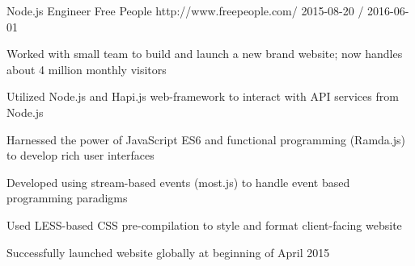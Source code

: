 \documentclass[11pt, a4paper]{awesome-cv}
\begin{document}
\begin{cventries}
  \cventry
    {Node.js Engineer}
    {Free People}
    {http://www.freepeople.com/}
    {2015-08-20 / 2016-06-01}
    {
          \begin{cvitems}
                \item{Worked with small team to build and launch a new brand website; now handles about 4 million monthly visitors}
                    \begin{cvitemssub}
                        \item{Utilized Node.js and Hapi.js web-framework to interact with API services from Node.js}
                        \item{Harnessed the power of JavaScript ES6 and functional programming (Ramda.js) to develop rich user interfaces}
                        \item{Developed using stream-based events (most.js) to handle event based programming paradigms}
                        \item{Used LESS-based CSS pre-compilation to style and format client-facing website}
                        \item{Successfully launched website globally at beginning of April 2015}
                    \end{cvitemssub}
          \end{cvitems}
    }
 

\end{cventries}
\end{document}
